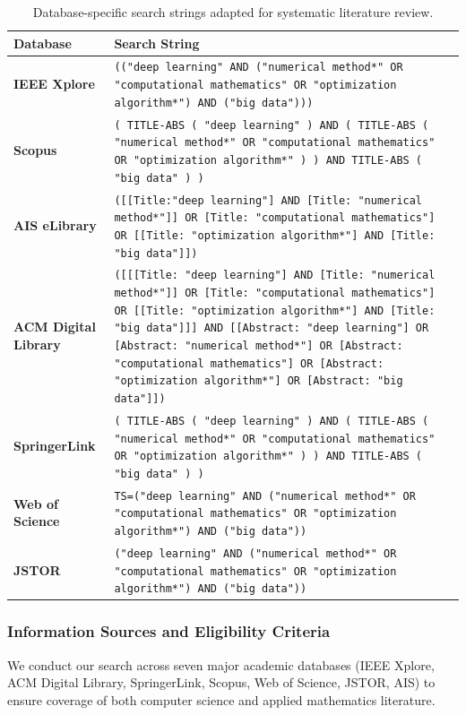 \documentclass[acmsmall]{acmart}
\begin{document}
\begin{table}[!htb]
    \centering
    \begingroup
    \renewcommand{\arraystretch}{1.3}
    \setlength{\tabcolsep}{6pt}
    \begin{tabular}{>{\bfseries}p{3cm} p{11cm}}
        \toprule
        \textbf{Database} & \textbf{Search String} \\
        \midrule
        IEEE Xplore & \texttt{(("deep learning" AND ("numerical method*" OR "computational mathematics" OR "optimization algorithm*") AND ("big data")))} \\
        \addlinespace
        Scopus & \texttt{( TITLE-ABS ( "deep learning" ) AND ( TITLE-ABS ( "numerical method*" OR "computational mathematics" OR "optimization algorithm*" ) ) AND TITLE-ABS ( "big data" ) )} \\
        \addlinespace
        AIS eLibrary & \texttt{([[Title:"deep learning"] AND [Title: "numerical method*"]] OR [Title: "computational mathematics"] OR [[Title: "optimization algorithm*"] AND [Title: "big data"]])} \\
        \addlinespace
        ACM Digital Library & \texttt{([[[Title: "deep learning"] AND [Title: "numerical method*"]] OR [Title: "computational mathematics"] OR [[Title: "optimization algorithm*"] AND [Title: "big data"]]] AND [[Abstract: "deep learning"] OR [Abstract: "numerical method*"] OR [Abstract: "computational mathematics"] OR [Abstract: "optimization algorithm*"] OR [Abstract: "big data"]])} \\
        \addlinespace
        SpringerLink & \texttt{( TITLE-ABS ( "deep learning" ) AND ( TITLE-ABS ( "numerical method*" OR "computational mathematics" OR "optimization algorithm*" ) ) AND TITLE-ABS ( "big data" ) )} \\
        \addlinespace
        Web of Science & \texttt{TS=("deep learning" AND ("numerical method*" OR "computational mathematics" OR "optimization algorithm*") AND ("big data"))} \\
        \addlinespace
        JSTOR & \texttt{("deep learning" AND ("numerical method*" OR "computational mathematics" OR "optimization algorithm*") AND ("big data"))} \\
        \bottomrule
    \end{tabular}
    \endgroup
    \caption{Database-specific search strings adapted for systematic literature review.}
    \label{tab:search_strings}
\end{table}

\subsubsection{Information Sources and Eligibility Criteria}\label{subsubsec:phase-1-planning-and-protocol-development:information-sources-and-eligibility-criteria}
We conduct our search across seven major academic databases (IEEE Xplore, ACM Digital Library, SpringerLink, Scopus, Web of Science, JSTOR, AIS) to ensure coverage of both computer science and applied mathematics literature.
\end{document}
